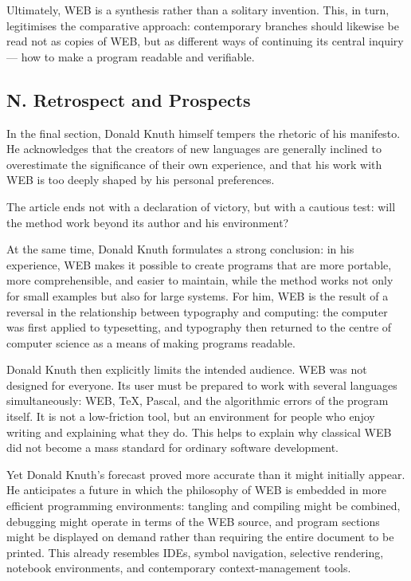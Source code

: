 \documentclass{ZGJournalArticle_2026}
\begin{document}
Ultimately, WEB is a synthesis rather than a solitary invention. This,
in turn, legitimises the comparative approach: contemporary branches
should likewise be read not as copies of WEB, but as different ways of
continuing its central inquiry --- how to make a program readable and
verifiable.

\subsection{N. Retrospect and
Prospects}\label{n.-retrospect-and-prospects}

In the final section, Donald Knuth himself tempers the rhetoric of his
manifesto. He acknowledges that the creators of new languages are
generally inclined to overestimate the significance of their own
experience, and that his work with WEB is too deeply shaped by his
personal preferences.

The article ends not with a declaration of victory, but with a cautious
test: will the method work beyond its author and his environment?

At the same time, Donald Knuth formulates a strong conclusion: in his
experience, WEB makes it possible to create programs that are more
portable, more comprehensible, and easier to maintain, while the method
works not only for small examples but also for large systems. For him,
WEB is the result of a reversal in the relationship between typography
and computing: the computer was first applied to typesetting, and
typography then returned to the centre of computer science as a means of
making programs readable.

Donald Knuth then explicitly limits the intended audience. WEB was not
designed for everyone. Its user must be prepared to work with several
languages simultaneously: WEB, TeX, Pascal, and the algorithmic errors
of the program itself. It is not a low-friction tool, but an environment
for people who enjoy writing and explaining what they do. This helps to
explain why classical WEB did not become a mass standard for ordinary
software development.

Yet Donald Knuth's forecast proved more accurate than it might initially
appear. He anticipates a future in which the philosophy of WEB is
embedded in more efficient programming environments: tangling and
compiling might be combined, debugging might operate in terms of the WEB
source, and program sections might be displayed on demand rather than
requiring the entire document to be printed. This already resembles
IDEs, symbol navigation, selective rendering, notebook environments, and
contemporary context-management tools.
\end{document}
